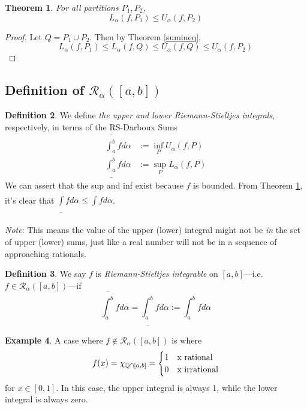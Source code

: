 \documentclass[12pt]{article}
\theoremstyle{plain}
\newtheorem{thm}{Theorem}[subsection]
\theoremstyle{definition}
\newtheorem{defn}[thm]{Definition}
\newtheorem{ex}[thm]{Example}
\theoremstyle{remark}
\begin{document}
\begin{thm} 
\label{pineq}
    For all partitions $P_1, P_2$, 
    \[ L_\alpha(f,P_1) \leq U_\alpha(f,P_2) \]
\end{thm}
\begin{proof} Let $Q = P_1 \cup P_2$. Then by Theorem \ref{sumineq}, 
    \[ L_\alpha(f,P_1) \leq L_\alpha(f,Q) \leq U_\alpha(f,Q) 
        \leq U_\alpha(f,P_2) \]
\end{proof}


\subsection{Definition of $\mathscr{R}_\alpha([a,b])$}


\begin{defn} We define \emph{the upper and lower Riemann-Stieltjes integrals}, respectively, in terms of the RS-Darboux Sums
    \begin{align*} 
        \overline{\int^b_a} f d\alpha &:= \inf_P U_\alpha(f,P) \\
        \underline{\int^b_a} f d\alpha &:= \sup_P L_\alpha(f,P)
    \end{align*}
We can assert that the sup and inf exist because $f$ is bounded. From Theorem \ref{pineq}, it's clear that $\underline{\int} f d\alpha \leq \overline{\int} f d\alpha$.
\\
\\
\emph{Note}: This means the value of the upper (lower) integral might not be \emph{in} the set of upper (lower) sums, just like a real number will not be in a sequence of approaching rationals. 
\end{defn}

\begin{defn} We say  $f$ is \emph{Riemann-Stieltjes integrable} on $[a,b]$---i.e. $f \in \mathscr{R}_\alpha([a,b])$---if 
    \[ \overline{\int^b_a} f d\alpha  =
        \underline{\int^b_a} f d\alpha 
        := {\int^b_a} f d\alpha
        \]
\end{defn}

\begin{ex} A case where $f \notin \mathscr{R}_\alpha([a,b])$ is where 
    \[ f(x) = \chi_{\mathbb{Q}\cap [a,b]}
        =\begin{cases} 1 & $x$\text{ rational} \\
            0 & $x$\text{ irrational} \end{cases}\]
for $x\in[0,1]$. In this case, the upper integral is always 1, while the lower integral is always zero.
\end{ex}
\end{document}
